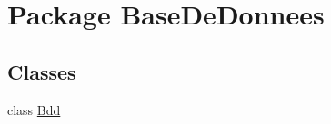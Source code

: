 \hypertarget{namespace_base_de_donnees}{\section{Package Base\+De\+Donnees}
\label{namespace_base_de_donnees}
}
\subsection*{Classes}
\begin{DoxyCompactItemize}
\item 
class \hyperlink{class_base_de_donnees_1_1_bdd}{Bdd}
\end{DoxyCompactItemize}
